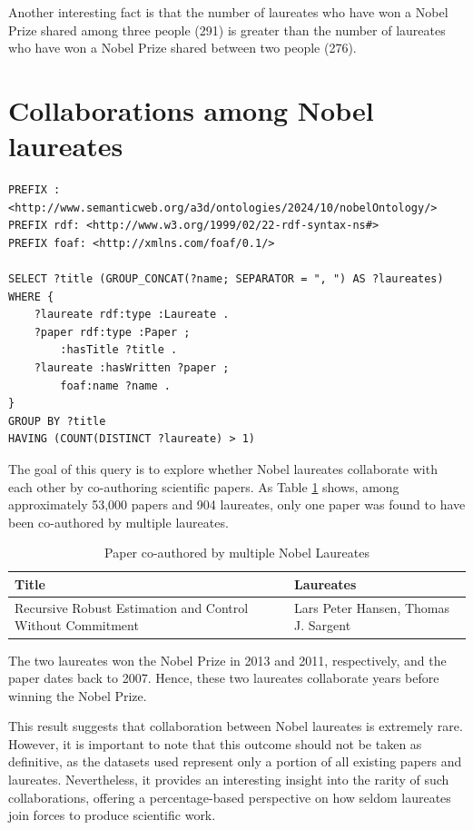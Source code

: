 \documentclass{article}
\begin{document}
Another interesting fact is that the number of laureates who have won a Nobel Prize shared among three people (291)
is greater than the number of laureates who have won a Nobel Prize shared between two people (276).

\newpage

\section{Collaborations among Nobel laureates}

\begin{lstlisting}
PREFIX : <http://www.semanticweb.org/a3d/ontologies/2024/10/nobelOntology/>
PREFIX rdf: <http://www.w3.org/1999/02/22-rdf-syntax-ns#>
PREFIX foaf: <http://xmlns.com/foaf/0.1/>

SELECT ?title (GROUP_CONCAT(?name; SEPARATOR = ", ") AS ?laureates) WHERE {
    ?laureate rdf:type :Laureate .
    ?paper rdf:type :Paper ;
        :hasTitle ?title .
    ?laureate :hasWritten ?paper ;
        foaf:name ?name .
}
GROUP BY ?title
HAVING (COUNT(DISTINCT ?laureate) > 1)
\end{lstlisting}

\vspace{1em}

The goal of this query is to explore whether Nobel laureates collaborate with each other by co-authoring
scientific papers. As Table \ref{tab:laureates_collaboration} shows, among approximately 53,000 papers
and 904 laureates, only one paper was found to have been co-authored by multiple laureates.

\begin{table}[H]
	\caption{Paper co-authored by multiple Nobel Laureates}
	\centering
	\begin{tabular}{|l|l|}
		\hline
		\textbf{Title}                                             & \textbf{Laureates}                   \\ \hline
		Recursive Robust Estimation and Control Without Commitment & Lars Peter Hansen, Thomas J. Sargent \\ \hline
	\end{tabular}
	\label{tab:laureates_collaboration}
\end{table}

The two laureates won the Nobel Prize in 2013 and 2011, respectively, and the paper dates back to 2007.
Hence, these two laureates collaborate years before winning the Nobel Prize.

This result suggests that collaboration between Nobel laureates is extremely rare. However, it is important to
note that this outcome should not be taken as definitive, as the datasets used represent only a portion of all
existing papers and laureates. Nevertheless, it provides an interesting insight into the rarity of such
collaborations, offering a percentage-based perspective on how seldom laureates join forces to produce scientific
work.
\end{document}
